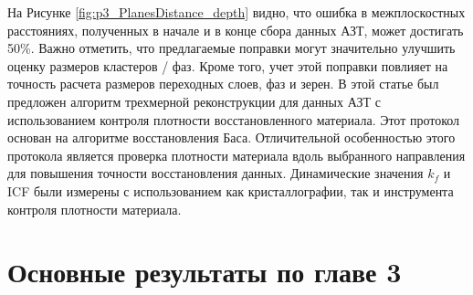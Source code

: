 На Рисунке \cref{fig:p3_PlanesDistance_depth} видно, что ошибка в межплоскостных расстояниях, полученных в начале и в конце сбора данных АЗТ, может достигать 50\%. Важно отметить, что предлагаемые поправки могут значительно улучшить оценку размеров кластеров / фаз. Кроме того, учет этой поправки повлияет на точность расчета размеров переходных слоев, фаз и зерен. 
В этой статье был предложен алгоритм трехмерной реконструкции для данных АЗТ с использованием контроля плотности восстановленного материала. Этот протокол основан на алгоритме восстановления Баса. Отличительной особенностью этого протокола является проверка плотности материала вдоль выбранного направления для повышения точности восстановления данных. Динамические значения $k_f$ и ICF были измерены с использованием как кристаллографии, так и инструмента контроля плотности материала.



\FloatBarrier
\section{Основные результаты по главе 3}\label{sec:ch3/sect6}












\clearpage
